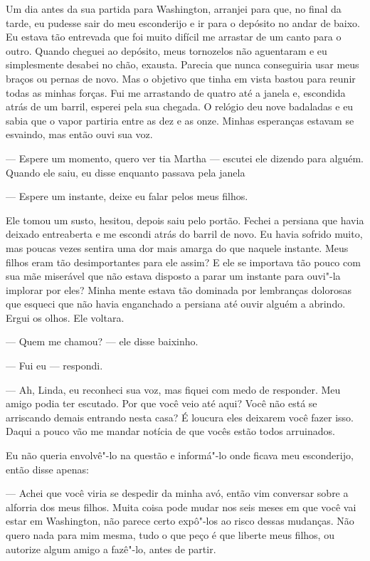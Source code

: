 Um dia antes da sua partida para
Washington, arranjei para que, no final da tarde, eu pudesse sair do meu
esconderijo e ir para o depósito no andar de baixo. Eu estava tão
entrevada que foi muito difícil me arrastar de um canto para o outro.
Quando cheguei ao depósito, meus tornozelos não aguentaram e eu
simplesmente desabei no chão, exausta. Parecia que nunca conseguiria
usar meus braços ou pernas de novo. Mas o objetivo que tinha em vista
bastou para reunir todas as minhas forças. Fui me arrastando de quatro
até a janela e, escondida atrás de um barril, esperei pela sua chegada.
O relógio deu nove badaladas e eu sabia que o vapor partiria entre as
dez e as onze. Minhas esperanças estavam se esvaindo, mas então ouvi sua
voz.

--- Espere um momento, quero ver tia Martha --- escutei ele dizendo para
alguém. Quando ele saiu, eu disse enquanto passava pela janela

--- Espere um instante, deixe eu falar pelos meus filhos.

Ele tomou um susto, hesitou, depois saiu pelo portão. Fechei a persiana
que havia deixado entreaberta e me escondi atrás do barril de novo. Eu
havia sofrido muito, mas poucas vezes sentira uma dor mais amarga do que
naquele instante. Meus filhos eram tão desimportantes para ele assim? E
ele se importava tão pouco com sua mãe miserável que não estava disposto
a parar um instante para ouvi"-la implorar por eles? Minha mente estava
tão dominada por lembranças dolorosas que esqueci que não havia
enganchado a persiana até ouvir alguém a abrindo. Ergui os olhos. Ele
voltara.

--- Quem me chamou? --- ele disse baixinho.

--- Fui eu --- respondi.

--- Ah, Linda, eu reconheci sua voz, mas fiquei com medo de responder.
Meu amigo podia ter escutado. Por que você veio até aqui? Você não está
se arriscando demais entrando nesta casa? É loucura eles deixarem você
fazer isso. Daqui a pouco vão me mandar notícia de que vocês estão todos
arruinados.

Eu não queria envolvê"-lo na questão e informá"-lo onde ficava meu
esconderijo, então disse apenas:

--- Achei que você viria se despedir da minha avó, então vim conversar
sobre a alforria dos meus filhos. Muita coisa pode mudar nos seis meses
em que você vai estar em Washington, não parece certo expô"-los ao risco
dessas mudanças. Não quero nada para mim mesma, tudo o que peço é que
liberte meus filhos, ou autorize algum amigo a fazê"-lo, antes de partir.

